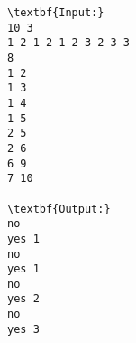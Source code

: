 \begin{verbatim}
\textbf{Input:}
10 3
1 2 1 2 1 2 3 2 3 3
8
1 2
1 3
1 4
1 5
2 5
2 6
6 9
7 10

\textbf{Output:}
no
yes 1
no
yes 1
no
yes 2
no
yes 3\end{verbatim}
